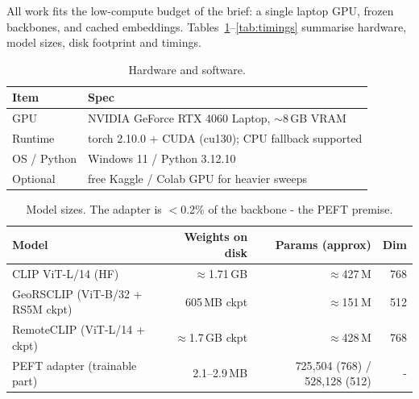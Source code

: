 \documentclass{article}
\begin{document}
All work fits the low-compute budget of the brief: a single laptop GPU, frozen
backbones, and cached embeddings. Tables~\ref{tab:hw}--\ref{tab:timings}
summarise hardware, model sizes, disk footprint and timings.

\begin{table}[H]
    \centering
    \caption{Hardware and software.}
    \label{tab:hw}
    \begin{tabular}{ll}
        \toprule
        \textbf{Item} & \textbf{Spec} \\
        \midrule
        GPU        & NVIDIA GeForce RTX 4060 Laptop, $\sim$8\,GB VRAM \\
        Runtime    & torch 2.10.0 + CUDA (cu130); CPU fallback supported \\
        OS / Python & Windows 11 / Python 3.12.10 \\
        Optional   & free Kaggle / Colab GPU for heavier sweeps \\
        \bottomrule
    \end{tabular}
\end{table}

\begin{table}[H]
    \centering
    \caption{Model sizes. The adapter is $<$0.2\% of the backbone - the PEFT premise.}
    \label{tab:models}
    \setlength{\tabcolsep}{4pt}
    \begin{tabular}{lrrr}
        \toprule
        \textbf{Model} & \textbf{Weights on disk} & \textbf{Params (approx)} & \textbf{Dim} \\
        \midrule
        CLIP ViT-L/14 (HF)                       & $\approx$1.71\,GB & $\approx$427\,M & 768 \\
        GeoRSCLIP (ViT-B/32 + RS5M ckpt)         & 605\,MB ckpt      & $\approx$151\,M & 512 \\
        RemoteCLIP (ViT-L/14 + ckpt)             & $\approx$1.7\,GB ckpt & $\approx$428\,M & 768 \\
        PEFT adapter (trainable part)   & 2.1--2.9\,MB      & 725{,}504 (768) / 528{,}128 (512) & - \\
        \bottomrule
    \end{tabular}
\end{table}
\end{document}
